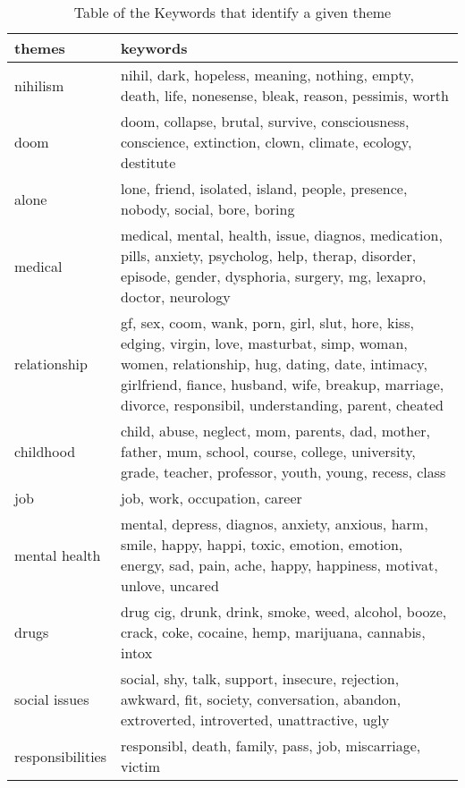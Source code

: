 \documentclass[../report.tex]{subfiles}
\begin{document}
\begin{table*}[ht]
        \centering
        \begin{tabular}{| l | l |}
        \toprule
                themes & keywords \\
        \midrule
   nihilism &  \multicolumn{1}{p{12cm}|}{nihil, dark, hopeless, meaning, nothing, empty, death, life, nonesense, bleak, reason, pessimis, worth} \\
   doom & \multicolumn{1}{p{12cm}|}{doom, collapse, brutal, survive, consciousness, conscience, extinction, clown, climate, ecology, destitute} \\
   alone & \multicolumn{1}{p{12cm}|}{lone, friend, isolated, island, people, presence, nobody, social, bore, boring} \\
    medical & \multicolumn{1}{p{12cm}|}{medical, mental, health, issue, diagnos, medication, pills, anxiety, psycholog, help, therap, disorder, episode, gender, dysphoria, surgery, mg, lexapro, doctor, neurology} \\
    relationship & \multicolumn{1}{p{12cm}|}{gf, sex, coom, wank, porn, girl, slut, hore, kiss, edging, virgin, love, masturbat, simp, woman, women, relationship, hug, dating, date, intimacy, girlfriend, fiance, husband, wife, breakup, marriage, divorce, responsibil, understanding, parent, cheated} \\
   childhood & \multicolumn{1}{p{12cm}|}{child, abuse, neglect, mom, parents, dad, mother, father, mum, school, course, college, university, grade, teacher, professor, youth, young, recess, class} \\
   job & \multicolumn{1}{p{12cm}|}{job, work, occupation, career} \\
   mental health & \multicolumn{1}{p{12cm}|}{mental, depress, diagnos, anxiety, anxious, harm, smile, happy, happi, toxic, emotion, emotion, energy, sad, pain, ache, happy, happiness, motivat, unlove, uncared} \\
   drugs & \multicolumn{1}{p{12cm}|}{drug cig, drunk, drink, smoke, weed, alcohol, booze, crack, coke, cocaine, hemp, marijuana, cannabis, intox} \\
    social issues & \multicolumn{1}{p{12cm}|}{social, shy, talk, support, insecure, rejection, awkward, fit, society, conversation, abandon, extroverted, introverted, unattractive, ugly} \\
    responsibilities & \multicolumn{1}{p{12cm}|}{responsibl, death, family, pass, job, miscarriage, victim} \\
        \bottomrule
        \end{tabular}
        \caption{Table of the Keywords that identify a given theme}
        \label{tab:keywords}
\end{table*}
\end{document}
